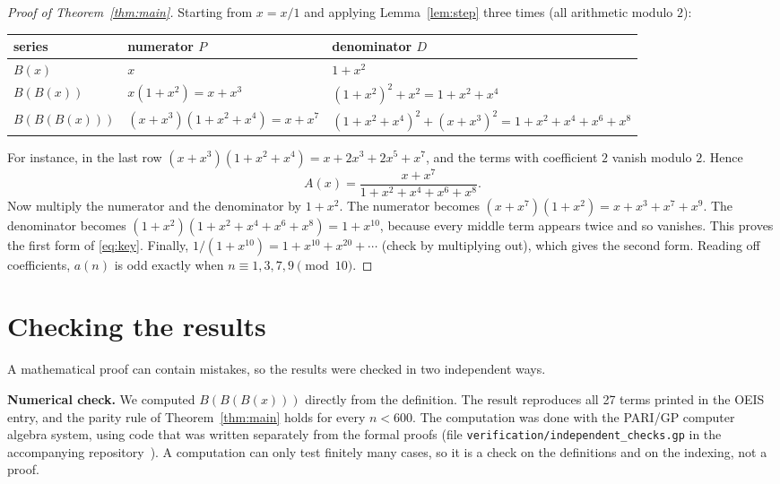 \documentclass[11pt,a4paper]{article}
\theoremstyle{definition}
\theoremstyle{remark}
\newcommand{\para}[1]{\par\medskip\noindent\textbf{#1}\enspace}
\begin{document}
\begin{proof}[Proof of Theorem~\ref{thm:main}]
Starting from $x=x/1$ and applying Lemma~\ref{lem:step} three times (all arithmetic modulo $2$):
\begin{center}\small\setlength{\tabcolsep}{4pt}\renewcommand{\arraystretch}{1.2}
\begin{tabular}{lll}
\toprule
series & numerator $P$ & denominator $D$\\
\midrule
$B(x)$ & $x$ & $1+x^2$\\
$B(B(x))$ & $x(1+x^2)=x+x^3$ & $(1+x^2)^2+x^2=1+x^2+x^4$\\
$B(B(B(x)))$ & $(x+x^3)(1+x^2+x^4)=x+x^7$ & $(1+x^2+x^4)^2+(x+x^3)^2=1+x^2+x^4+x^6+x^8$\\
\bottomrule
\end{tabular}
\end{center}
For instance, in the last row $(x+x^3)(1+x^2+x^4)=x+2x^3+2x^5+x^7$, and the terms with coefficient $2$ vanish
modulo $2$. Hence
\[
A(x)=\frac{x+x^7}{1+x^2+x^4+x^6+x^8}.
\]
Now multiply the numerator and the denominator by $1+x^2$. The numerator becomes $(x+x^7)(1+x^2)=x+x^3+x^7+x^9$. The
denominator becomes $(1+x^2)(1+x^2+x^4+x^6+x^8)=1+x^{10}$, because every middle term appears twice and so vanishes.
This proves the first form of \eqref{eq:key}. Finally, $1/(1+x^{10})=1+x^{10}+x^{20}+\cdots$ (check by multiplying out),
which gives the second form. Reading off coefficients, $a(n)$ is odd exactly when $n\equiv1,3,7,9\pmod{10}$.
\end{proof}

\section{Checking the results}\label{sec:checks}

A mathematical proof can contain mistakes, so the results were checked in two independent ways.

\para{Numerical check.}
We computed $B(B(B(x)))$ directly from the definition. The result reproduces all 27 terms printed in the OEIS
entry, and the parity rule of Theorem~\ref{thm:main} holds for every $n<600$.
The computation was done with the PARI/GP computer algebra system, using code that was written separately from the
formal proofs (file \texttt{verification/independent\_checks.gp} in the accompanying repository~\cite{repo}).
A computation can only test finitely many cases, so it is a check on the definitions and on the indexing, not a proof.
\end{document}
